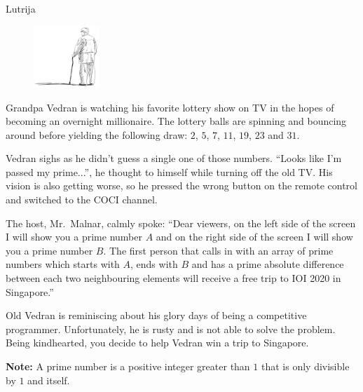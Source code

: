 \begin{statement}[
  problempoints=70,
  timelimit=1 second,
  memorylimit=512 MiB,
]{Lutrija}

\setlength\intextsep{-0.1cm}
\begin{figure}
\centering
\includegraphics[width=0.22\textwidth]{img/vedran_kurdija.png}
\end{figure}


Grandpa Vedran is watching his favorite lottery show on TV in the hopes of
becoming an overnight millionaire. The lottery balls are spinning and bouncing
around before yielding the following draw: $2$, $5$, $7$, $11$, $19$, $23$ and
$31$.

Vedran sighs as he didn't guess a single one of those numbers. ``Looks like
I'm passed my prime...'', he thought to himself while turning off the old
TV. His vision is also getting worse, so he pressed the wrong button on the
remote control and switched to the COCI channel.

The host, Mr.\ Malnar, calmly spoke: ``Dear viewers, on the left side of the screen
I will show you a prime number $A$ and on the right side of the screen I will
show you a prime number $B$. The first person that calls in with an array of
prime numbers which starts with $A$, ends with $B$ and has a prime absolute
difference between each two neighbouring elements will receive a free trip
to IOI 2020 in Singapore.''


Old Vedran is reminiscing about his glory days of being a competitive programmer.
Unfortunately, he is rusty and is not able to solve the problem. Being
kindhearted, you decide to help Vedran win a trip to Singapore.

\textbf{Note:} A prime number is a positive integer greater than $1$ that is
only divisible by $1$ and itself.



\end{statement}
